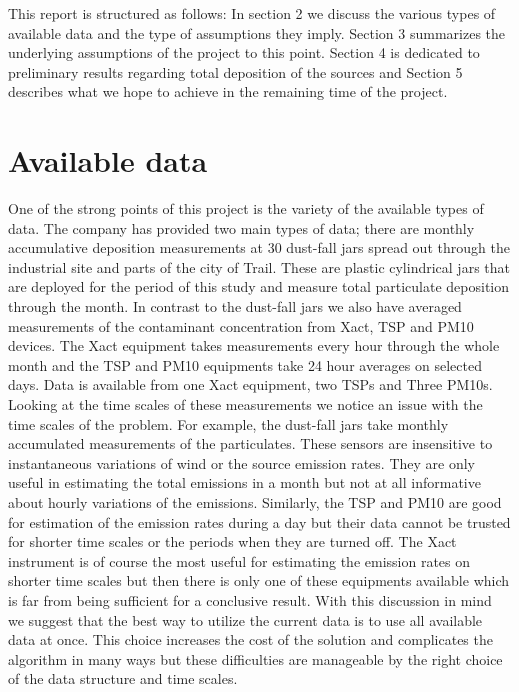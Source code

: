 \documentclass[11pt]{article}
\begin{document}
This report is structured as follows: In section 2 we discuss the various types 
of available data and the type of assumptions they imply. Section 3 summarizes 
the underlying assumptions of the project to this point. Section 4 is dedicated 
to preliminary results regarding total deposition of the sources and Section 5
describes what we hope to achieve in the remaining time of the project.

\section{Available data}
One of the strong points of this project is the variety  of the available types 
of data. The company has provided two main types of data; there are monthly 
accumulative deposition measurements at 30 dust-fall jars spread out through 
the industrial site and parts of the city of Trail. These are plastic 
cylindrical jars that are deployed for the period of this study and 
measure total particulate deposition through the month. In contrast 
to the dust-fall jars we also have averaged measurements of the 
 contaminant concentration from Xact, TSP and PM10 devices. The Xact equipment 
takes measurements every hour through the whole month and the TSP and PM10
equipments take 24 hour averages on selected days. Data is available from 
one Xact equipment, two TSPs and Three PM10s.\\

Looking at the time scales of these measurements we notice an issue with 
the time scales of the problem. For example, the dust-fall jars 
take monthly accumulated measurements of the particulates. These sensors 
are insensitive to instantaneous variations of wind or the source emission rates. 
They are only useful in estimating the total emissions in a month 
but not at all informative about hourly variations of the emissions. Similarly,
the TSP and PM10 are good for estimation of the emission rates during a day 
but their data cannot be trusted for shorter time scales or the periods when 
they are turned off. The Xact instrument is of course the most useful for 
estimating the emission rates on shorter time scales but then there is 
only one of these equipments available which is far from being sufficient
 for a conclusive result. With this discussion in mind we suggest that the 
best way to utilize the current data is to use all available data 
at once. This choice increases the cost of the solution and complicates 
the algorithm in many ways but these difficulties are manageable by the 
right choice of the data structure and time scales.
 
\end{document}
